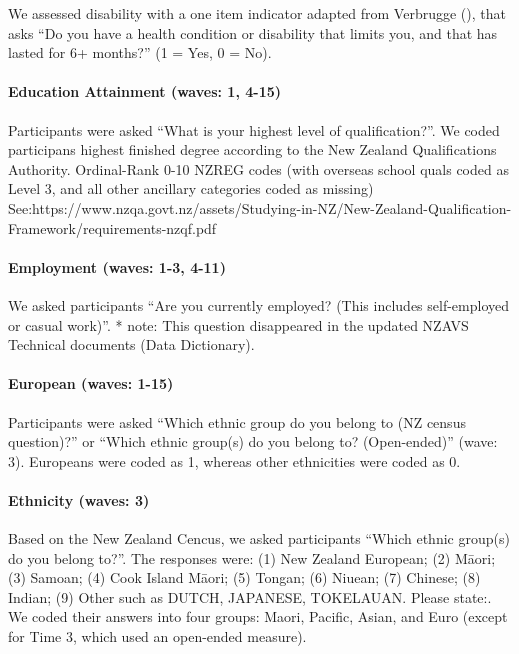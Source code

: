 \documentclass[
  singlecolumn]{article}
\let\oldparagraph\paragraph
\renewcommand{\paragraph}[1]{\oldparagraph{#1}\mbox{}}
\begin{document}
We assessed disability with a one item indicator adapted from Verbrugge
(), that asks ``Do you have a health
condition or disability that limits you, and that has lasted for 6+
months?'' (1 = Yes, 0 = No).

\paragraph{Education Attainment (waves: 1,
4-15)}\label{education-attainment-waves-1-4-15}

Participants were asked ``What is your highest level of
qualification?''. We coded participans highest finished degree according
to the New Zealand Qualifications Authority. Ordinal-Rank 0-10 NZREG
codes (with overseas school quals coded as Level 3, and all other
ancillary categories coded as missing)
See:https://www.nzqa.govt.nz/assets/Studying-in-NZ/New-Zealand-Qualification-Framework/requirements-nzqf.pdf

\paragraph{Employment (waves: 1-3,
4-11)}\label{employment-waves-1-3-4-11}

We asked participants ``Are you currently employed? (This includes
self-employed or casual work)''. * note: This question disappeared in
the updated NZAVS Technical documents (Data Dictionary).

\paragraph{European (waves: 1-15)}\label{european-waves-1-15}

Participants were asked ``Which ethnic group do you belong to (NZ census
question)?'' or ``Which ethnic group(s) do you belong to? (Open-ended)''
(wave: 3). Europeans were coded as 1, whereas other ethnicities were
coded as 0.

\paragraph{Ethnicity (waves: 3)}\label{ethnicity-waves-3}

Based on the New Zealand Cencus, we asked participants ``Which ethnic
group(s) do you belong to?''. The responses were: (1) New Zealand
European; (2) Māori; (3) Samoan; (4) Cook Island Māori; (5) Tongan; (6)
Niuean; (7) Chinese; (8) Indian; (9) Other such as DUTCH, JAPANESE,
TOKELAUAN. Please state:. We coded their answers into four groups:
Maori, Pacific, Asian, and Euro (except for Time 3, which used an
open-ended measure).
\end{document}
